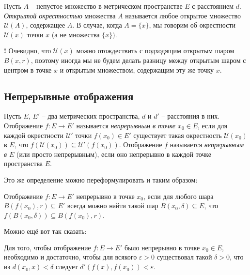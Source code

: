 \begin{definition}
    Пусть $A$ -- непустое множество в метрическом пространстве $E$ с расстоянием $d$. \textit{Открытой окрестностью} множества $A$ называется любое открытое множество $\mathscr{U}(A)$, содержащее $A$. В случае, когда $A = \{x\}$, мы говорим об окрестности $\mathscr{U}(x)$ точки $x$ (а не множества $\{x\}).$
\end{definition}

\begin{mydanger}{\bf{!}}
 Очевидно, что $\mathscr{U}(x)$ можно отождествить с подходящим открытым шаром $B(x,r)$, поэтому иногда мы не будем делать разницу между открытым шаром с центром в точке $x$ и открытым множеством, содержащим эту же точку $x.$    
\end{mydanger}

\subsection{Непрерывные отображения}

\begin{definition}
    Пусть $E$, $E'$ -- два метрических пространства, $d$ и $d'$ -- расстояния в них. Отображение $f:E \to E'$ называется \textit{непрерывным в точке $x_0 \in E$}, если для каждой окрестности $\mathscr{U}'$ точки $f(x_0) \in E'$ существует такая окрестность $\mathscr{U}(x_0)$ в $E$, что $f(\mathscr{U}(x_0)) \subseteq \mathscr{U}'(f(x_0))$. Отображение $f$ называется \textit{непрерывным в $E$} (или просто непрерывным), если оно непрерывно в каждой точке пространства $E.$
\end{definition}

Это же определение можно переформулировать и таким образом:

\begin{definition}
    Отображение $f:E \to E'$ непрерывно в точке $x_0$, если для любого шара $B(f(x_0), r) \subseteq E'$ всегда можно найти такой шар $B(x_0, \delta) \subseteq E$, что $f(B(x_0, \delta)) \subseteq B(f(x_0), r)$.
\end{definition}

Можно ещё вот так сказать:

\begin{definition}\label{reform_of_cont}
    Для того, чтобы отображение $f:E \to E'$ было непрерывно в точке $x_0 \in E$, необходимо и достаточно, чтобы для всякого $\varepsilon>0$ существовал такой $\delta >0$, что из $d(x_0,x)<\delta$ следует $d'(f(x),f(x_0))<\varepsilon$.
\end{definition}

